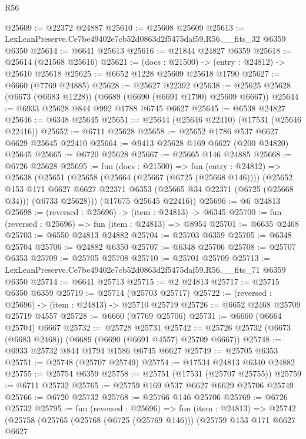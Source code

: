 \begin{lexlean}{R56}
\begin{coremodule}
@25609 := @22372 @24887
@25610 := @25608 @25609
@25613 := LexLeanPreserve.Ce7be49402e7cb52d0863d2f5475daf59.R56.__fits_32 @6359 @6350
@25614 := @6641 @25613
@25616 := @21844 @24827 @6359
@25618 := @25614 (@21568 @25616)
@25621 := (docs : @21500) -> (entry : @24812) -> @25610 @25618
@25625 := @6652 @1228 @25609 @25618 @1790
@25627 := @6660 (@7769 @24885)
@25628 := @25627 @22392
@25638 := @25625 @25628 (@6673 (@6683 @1228)) (@6689 (@6690 (@6691 @1790) @25609 @6667))
@25644 := @6933 @25628 @844 @992 @1788 @6745 @6627
@25645 := @6538 @24827
@25646 := @6348 @25645
@25651 := @25644 (@25646 @22410) (@17531 (@25646 @22416))
@25652 := @6711 @25628
@25658 := @25652 @1786 @537 @6627 @6629 @25645 @22410
@25664 := @9413 @25628 @169 @6627 (@200 @24820) @25645
@25665 := @6720 @25628
@25667 := @25665 @146 @24885
@25668 := @6726 @25628
@25695 := fun (docs : @21500) =>
  fun (entry : @24812) =>
  @25638
    (@25651
      (@25658
        (@25664 (@25667 (@6725 (@25668 @146))))
        (@25652
          @153
          @171
          @6627
          @6627
          @22371
          @6353
          (@25665 @34 @22371 (@6725 (@25668 @34)))
          (@6733 @25628)))
      (@17675 @25645 @22416))
@25696 := @6 @24813
@25698 := (reversed : @25696) -> (item : @24813) -> @6345
@25700 := fun (reversed : @25696) => fun (item : @24813) => @8954
@25701 := @6635 @2468
@25703 := @6550 @24813 @24882
@25704 := @25703 @6359
@25705 := @6348 @25704
@25706 := @24882 @6350
@25707 := @6348 @25706
@25708 := @25707 @6353
@25709 := @25705 @25708
@25710 := @25701 @25709
@25713 := LexLeanPreserve.Ce7be49402e7cb52d0863d2f5475daf59.R56.__fits_71 @6359 @6350
@25714 := @6641 @25713
@25715 := @2 @24813
@25717 := @25715 @6350 @6359
@25719 := @25714 (@25703 @25717)
@25722 := (reversed : @25696) -> (item : @24813) -> @25710 @25719
@25726 := @6652 @2468 @25709 @25719 @4557
@25728 := @6660 (@7769 @25706)
@25731 := @6660 (@6664 @25704) @6667
@25732 := @25728 @25731
@25742 := @25726 @25732 (@6673 (@6683 @2468)) (@6689 (@6690 (@6691 @4557) @25709 @6667))
@25748 := @6933 @25732 @844 @1794 @1586 @6745 @6627
@25749 := @25705 @6353
@25751 := @25748 (@25707 @25749)
@25754 := @17534 @24813 @6340 @24882
@25755 := @25754 @6359
@25758 := @25751 (@17531 (@25707 @25755))
@25759 := @6711 @25732
@25765 := @25759 @169 @537 @6627 @6629 @25706 @25749
@25766 := @6720 @25732
@25768 := @25766 @146 @25706
@25769 := @6726 @25732
@25795 := fun (reversed : @25696) =>
  fun (item : @24813) =>
  @25742
    (@25758
      (@25765
        (@25768 (@6725 (@25769 @146)))
        (@25759
          @153
          @171
          @6627
          @6627

\end{coremodule}
\end{lexlean}
